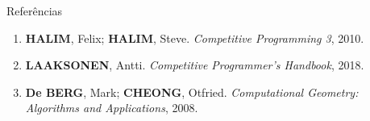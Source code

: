 \begin{frame}[fragile]{Referências}

    \begin{enumerate}
        \item \textbf{HALIM}, Felix; \textbf{HALIM}, Steve. \textit{Competitive Programming 3}, 2010.
        \item \textbf{LAAKSONEN}, Antti. \textit{Competitive Programmer's Handbook}, 2018.

        \item \textbf{De BERG}, Mark; \textbf{CHEONG}, Otfried. \textit{Computational Geometry: Algorithms and Applications}, 2008.

    \end{enumerate}

\end{frame}
